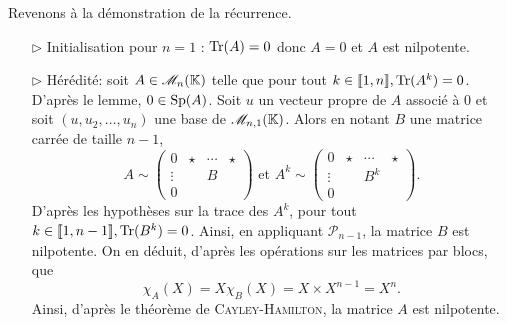 \begin{preuve}
\begin{itemize}
        Revenons à la démonstration de la récurrence.
        \begin{itemize}
            \item[$\rhd$] Initialisation pour $n=1$ : $\mathrm{Tr}(A) = 0$ donc $A = 0$ et $A$ est nilpotente. 
            \item[$\rhd$] Hérédité: soit $A \in \mathscr{M}_n(\mathbb{K})$ telle que pour tout $k \in \llbracket 1, n \rrbracket, \mathrm{Tr}(A^k) = 0$. \\
            D'après le lemme, $0 \in \mathrm{Sp}(A)$. Soit $u$ un vecteur propre de $A$ associé à $0$ et soit $(u, u_2, \dots, u_n)$ une base de $\mathscr{M}_{n,1}(\mathbb{K})$. Alors en notant $B$ une matrice carrée de taille $n-1$, 
            $$A \sim 
            \begin{pmatrix}
            0 & \star & \cdots & \star \\
            \vdots & & B & \\
            0 & & &
            \end{pmatrix}
            \text{ et }
            A^k \sim 
            \begin{pmatrix}
            0 & \star & \cdots & \star \\
            \vdots & & B^k & \\
            0 & & &
            \end{pmatrix}.
            $$
            D'après les hypothèses sur la trace des $A^k$, pour tout $k \in \llbracket 1, n-1 \rrbracket, \mathrm{Tr}(B^k) = 0$. Ainsi, en appliquant $\mathscr{P}_{n-1}$, la matrice $B$ est nilpotente. On en déduit, d'après les opérations sur les matrices par blocs, que
            $$\chi_A(X) = X \chi_{B}(X) = X \times X^{n-1} = X^n.$$
            Ainsi, d'après le théorème de \textsc{Cayley}-\textsc{Hamilton}, la matrice $A$ est nilpotente. 
        \end{itemize}
    \end{itemize}
\end{preuve}

